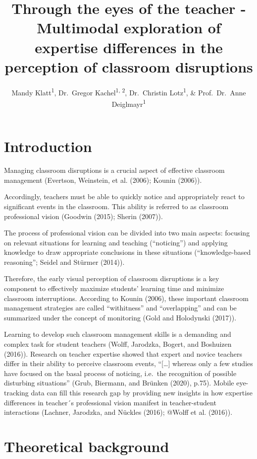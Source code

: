 \documentclass[
  man,floatsintext]{apa6}
\title{Through the eyes of the teacher - Multimodal exploration of expertise differences in the perception of classroom disruptions}
\author{Mandy Klatt\textsuperscript{1}, Dr.~Gregor Kachel\textsuperscript{1, 2}, Dr.~Christin Lotz\textsuperscript{1}, \& Prof.~Dr.~Anne Deiglmayr\textsuperscript{1}}
\date{}
\affiliation{\vspace{0.5cm}\textsuperscript{1} Leipzig University\\\textsuperscript{2} Max-Planck University for Evolutionary Anthropology}
\begin{document}
\maketitle

\hypertarget{introduction}{%
\section{Introduction}\label{introduction}}

Managing classroom disruptions is a crucial aspect of effective classroom management (Evertson, Weinstein, et al. (2006); Kounin (2006)).

Accordingly, teachers must be able to quickly notice and appropriately react to significant events in the classroom. This ability is referred to as classroom professional vision (Goodwin (2015); Sherin (2007)).

The process of professional vision can be divided into two main aspects: focusing on relevant situations for learning and teaching (``noticing'') and applying knowledge to draw appropriate conclusions in these situations (``knowledge-based reasoning''; Seidel and Stürmer (2014)).

Therefore, the early visual perception of classroom disruptions is a key component to effectively maximize students' learning time and minimize classroom interruptions. According to Kounin (2006), these important classroom management strategies are called ``withitness'' and ``overlapping'' and can be summarized under the concept of monitoring (Gold and Holodynski (2017)).

Learning to develop such classroom management skills is a demanding and complex task for student teachers (Wolff, Jarodzka, Bogert, and Boshuizen (2016)). Research on teacher expertise showed that expert and novice teachers differ in their ability to perceive classroom events, ``{[}\ldots{]} whereas only a few studies have focused on the basal process of noticing, i.e.~the recognition of possible disturbing situations'' (Grub, Biermann, and Brünken (2020), p.75). Mobile eye-tracking data can fill this research gap by providing new insights in how expertise differences in teacher´s professional vision manifest in teacher-student interactions (Lachner, Jarodzka, and Nückles (2016); @Wolff et al. (2016)).

\hypertarget{theoretical-background}{%
\section{Theoretical background}\label{theoretical-background}}
\end{document}
